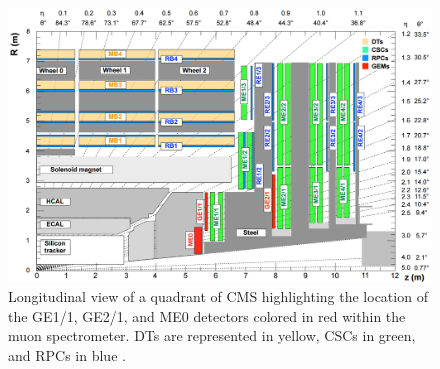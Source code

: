     \begin{figure}[t!]
      \centering
      \includegraphics[width=\textwidth]{img/II-1-gem/ls3.png}
      \caption{Longitudinal view of a quadrant of CMS highlighting the location of the GE1/1, GE2/1, and ME0 detectors colored in red within the muon spectrometer. DTs are represented in yellow, CSCs in green, and RPCs in blue \cite{Thierry:2065693}.}
      \label{fig:II-1-ls3}
    \end{figure}
